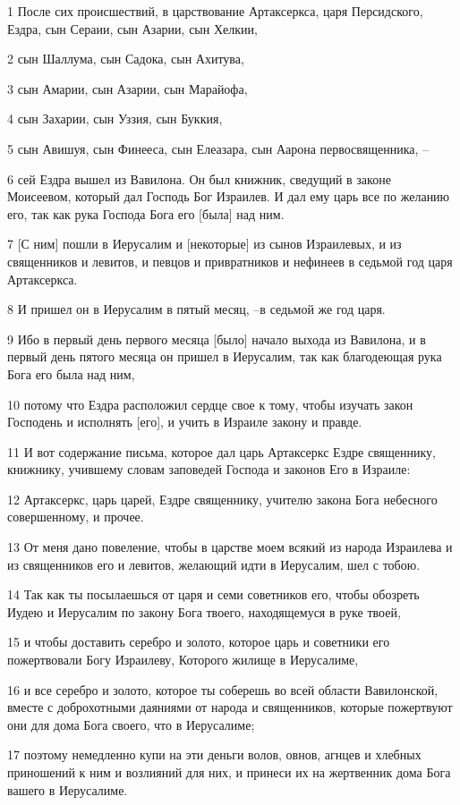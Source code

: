 \par 1 После сих происшествий, в царствование Артаксеркса, царя Персидского, Ездра, сын Сераии, сын Азарии, сын Хелкии,
\par 2 сын Шаллума, сын Садока, сын Ахитува,
\par 3 сын Амарии, сын Азарии, сын Марайофа,
\par 4 сын Захарии, сын Уззия, сын Буккия,
\par 5 сын Авишуя, сын Финееса, сын Елеазара, сын Аарона первосвященника, --
\par 6 сей Ездра вышел из Вавилона. Он был книжник, сведущий в законе Моисеевом, который дал Господь Бог Израилев. И дал ему царь все по желанию его, так как рука Господа Бога его [была] над ним.
\par 7 [С ним] пошли в Иерусалим и [некоторые] из сынов Израилевых, и из священников и левитов, и певцов и привратников и нефинеев в седьмой год царя Артаксеркса.
\par 8 И пришел он в Иерусалим в пятый месяц, --в седьмой же год царя.
\par 9 Ибо в первый день первого месяца [было] начало выхода из Вавилона, и в первый день пятого месяца он пришел в Иерусалим, так как благодеющая рука Бога его была над ним,
\par 10 потому что Ездра расположил сердце свое к тому, чтобы изучать закон Господень и исполнять [его], и учить в Израиле закону и правде.
\par 11 И вот содержание письма, которое дал царь Артаксеркс Ездре священнику, книжнику, учившему словам заповедей Господа и законов Его в Израиле:
\par 12 Артаксеркс, царь царей, Ездре священнику, учителю закона Бога небесного совершенному, и прочее.
\par 13 От меня дано повеление, чтобы в царстве моем всякий из народа Израилева и из священников его и левитов, желающий идти в Иерусалим, шел с тобою.
\par 14 Так как ты посылаешься от царя и семи советников его, чтобы обозреть Иудею и Иерусалим по закону Бога твоего, находящемуся в руке твоей,
\par 15 и чтобы доставить серебро и золото, которое царь и советники его пожертвовали Богу Израилеву, Которого жилище в Иерусалиме,
\par 16 и все серебро и золото, которое ты соберешь во всей области Вавилонской, вместе с доброхотными даяниями от народа и священников, которые пожертвуют они для дома Бога своего, что в Иерусалиме;
\par 17 поэтому немедленно купи на эти деньги волов, овнов, агнцев и хлебных приношений к ним и возлияний для них, и принеси их на жертвенник дома Бога вашего в Иерусалиме.
